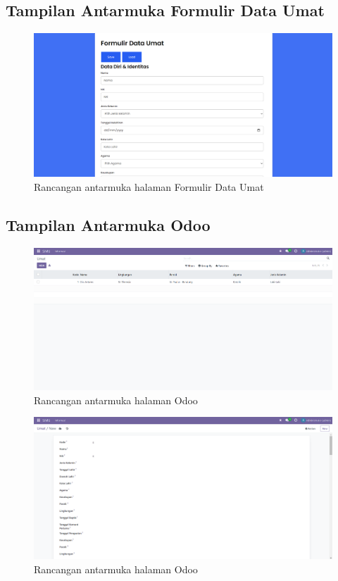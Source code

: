 \subsection{Tampilan Antarmuka Formulir Data Umat}

\begin{figure}[H]
	\centering
	\includegraphics[scale=0.41]{Gambar/halamanFormulir.png}
	\caption{Rancangan antarmuka halaman Formulir Data Umat} 
	\label{fig:formDataUmatFull}
\end{figure}

\subsection{Tampilan Antarmuka Odoo}

\begin{figure}[H]
	\centering
	\includegraphics[scale=0.4]{Gambar/odooBuatBaru.png}
	\caption{Rancangan antarmuka halaman Odoo} 
	\label{fig:odooBuatBaru}
\end{figure}

\begin{figure}[H]
	\centering
	\includegraphics[scale=0.4]{Gambar/odooBuatBaru2.png}
	\caption{Rancangan antarmuka halaman Odoo} 
	\label{fig:odooBuatBaru2}
\end{figure}

